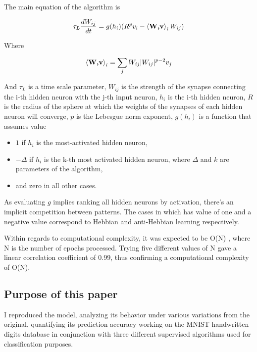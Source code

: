\documentclass[a4paper]{report}
\begin{document}
The main equation of the algorithm is

\begin{equation}
    \tau_L \frac{dW_{ij}}{dt} = g(h_i)(R^p v_i - \braket{\textbf{W,v}}_i W_{ij} )
    \label{main}
\end{equation}

Where

\begin{equation}
    \braket{\textbf{W,v}}_i = \sum_j W_{ij} |W_{ij}|^{p-2} v_j
\end{equation}

And $\tau_L$ is a time scale parameter,  $W_{ij}$ is the strength of the synapse connecting the i-th hidden neuron with the j-th input neuron, $h_i$ is the i-th hidden neuron, $R$ is the radius of the sphere at which the weights of the synapses of each hidden neuron will converge, $p$ is the Lebesgue norm exponent, $g(h_i)$ is a function that assumes value
\begin{itemize}
    \item $1$ if $h_i$ is the most-activated hidden neuron,
    \item $-\Delta$ if $h_i$ is the k-th most activated hidden neuron, where $\Delta$ and $k$ are parameters of the algorithm,
    \item and zero in all other cases.
\end{itemize}

As evaluating $g$ implies ranking all hidden neurons by activation, there's an implicit competition between patterns.
The cases in which has value of one and a negative value correspond to Hebbian and anti-Hebbian learning respectively.

Within regards to computational complexity, it was expected to be O(N) , where N is the number of epochs processed.
Trying five different values of N gave a linear correlation coefficient of 0.99, thus confirming a computational complexity of O(N).

\subsection{Purpose of this paper}

I reproduced the model, analyzing its behavior under various variations from the original, quantifying its prediction accuracy working on the MNIST handwritten digits database in conjunction with three different supervised algorithms used for classification purposes.
\end{document}
